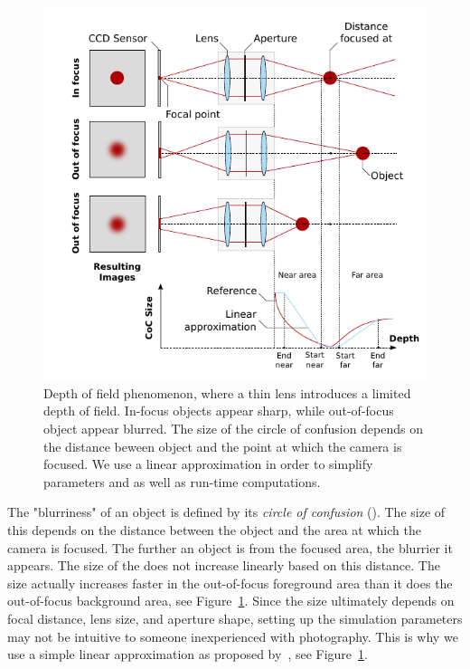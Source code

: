 	\begin{figure}[htb]\centering
	\includegraphics[width=\textwidth]{DerousiersFigs/focus.pdf}
	\caption{Depth of field phenomenon, where a thin lens introduces a limited depth of field. In-focus objects appear sharp, while out-of-focus object appear blurred. The size of the circle of confusion depends on the distance beween object and the point at which the camera is focused. We use a linear approximation in order to simplify parameters and as well as run-time computations. }
	\label{DeRousiers:focus}
	\end{figure}


The "blurriness" of an object is defined by its \emph{circle of confusion} (\coc). The size of this \coc depends on the distance between the object and the area at which the camera is focused. The further an object is from the focused area, the blurrier it appears. The size of the \coc does not increase linearly based on this distance. The size actually increases faster in the out-of-focus foreground area than it does the out-of-focus background area, see Figure~\ref{DeRousiers:focus}. Since the \coc size ultimately depends on focal distance, lens size, and aperture shape, setting up the simulation parameters may not be intuitive to someone inexperienced with photography. This is why we use a simple linear approximation as proposed by~\cite{Hammon07}, see Figure~\ref{DeRousiers:focus}.

